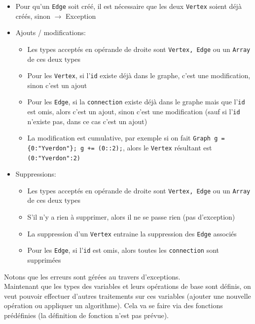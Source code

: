\documentclass[french]{article}
\begin{document}
\begin{itemize}
\begin{itemize}
						\item Pour qu'un \texttt{Edge} soit créé, il est nécessaire que les deux \texttt{Vertex} soient déjà créés, sinon $\rightarrow$ Exception
						\item Ajouts / modifications:
						\begin{itemize}
							\item Les types acceptés en opérande de droite sont \texttt{Vertex, Edge} ou un \texttt{Array} de ces deux types
							\item Pour les \texttt{Vertex}, si l'\texttt{id} existe déjà dans le graphe, c'est une modification, sinon c'est un ajout
							\item Pour les \texttt{Edge}, si la \texttt{connection} existe déjà dans le graphe mais que l'\texttt{id} est omis, alors c'est un ajout, sinon c'est une modification (sauf si l'\texttt{id} n'existe pas, dans ce cas c'est un ajout)
							\item La modification est cumulative, par exemple si on fait \texttt{Graph g = \{0:"Yverdon"\}; g += (0::2);}, alors le \texttt{Vertex} résultant est \texttt{(0:"Yverdon":2)}
						\end{itemize}
						\item Suppressions:
						\begin{itemize}
							\item Les types acceptés en opérande de droite sont \texttt{Vertex, Edge} ou un \texttt{Array} de ces deux types
							\item S'il n'y a rien à supprimer, alors il ne se passe rien (pas d'exception)
							\item La suppression d'un \texttt{Vertex} entraine la suppression des \texttt{Edge} associés
							\item Pour les \texttt{Edge}, si l'\texttt{id} est omis, alors toutes les \texttt{connection} sont supprimées
						\end{itemize}
					\end{itemize}
				\end{itemize}
				
				Notons que les erreurs sont gérées au travers d'exceptions.\\
				
				Maintenant que les types des variables et leurs opérations de base sont définis, on veut pouvoir effectuer d'autres traitements sur ces variables (ajouter une nouvelle opération ou appliquer un algorithme). Cela va se faire via des fonctions prédéfinies (la définition de fonction n'est pas prévue).\\
				
\end{document}
